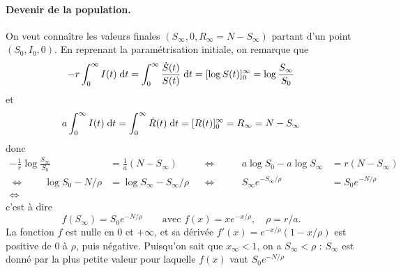 \paragraph{Devenir de la population.}
On veut connaître les valeurs finales $(S_\infty, 0, R_\infty = N - S_\infty)$ partant d'un point $(S_0, I_0, 0)$. En reprenant la paramétrisation initiale, on remarque que
$$
-r \int_0^\infty I(t) \; \text{d} t
= \int_0^\infty \frac{\dot S(t)}{S(t)} \; \text{d} t
= [\log S(t)]_0^\infty
= \log \frac{S_\infty}{S_0}
$$
et
$$
a \int_0^\infty I(t) \; \text{d} t
= \int_0^\infty \dot R(t) \; \text{d} t
= [R(t)]_0^\infty
= R_\infty = N - S_\infty
$$
donc
\begin{align*}
  -\frac1r \log \frac{S_\infty}{S_0} & = \frac1a (N - S_\infty) & 
  & \Leftrightarrow \qquad & 
  a \log {S_0} - a \log {S_\infty} & = r (N - S_\infty) \\
  \Leftrightarrow \qquad
  \log S_0  - N / \rho & = \log S_\infty - S_\infty / \rho &
  & \Leftrightarrow \qquad &
  S_\infty e^{- S_\infty/\rho} & = S_0 e^{- N / \rho} \\
  \Leftrightarrow \qquad
   &
\end{align*}
c'est à dire
$$
f(S_\infty) = S_0 e^{- N / \rho}
\qquad \text{avec } f(x) = x e^{-x/\rho},
\quad \rho = r/a.
$$
La fonction $f$ est nulle en 0 et $+\infty$, et sa dérivée $f'(x) = e^{-x/\rho}(1 - x/\rho)$ est positive de 0 à $\rho$, puis négative.
Puisqu'on sait que $x_\infty  < 1$, on a $S_\infty < \rho$ : $S_\infty$ est donné par la plus petite valeur pour laquelle $f(x)$ vaut $S_0 e^{- N / \rho}$

